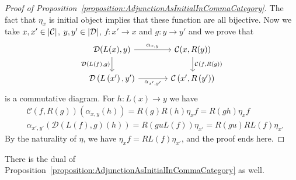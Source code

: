 \begin{proof}[Proof of
  Proposition~\ref{proposition:AdjunctionAsInitialInCommaCategory}]
  The fact that \(\eta_x\) is initial object implies that these function
  are all bijective. Now we take \(x, x' \in \left\lvert\mathcal{C}\right\rvert\),
  \(y, y' \in \left\lvert\mathcal{D}\right\rvert\), \(f : x' \to x\) and \(g : y \to y'\) and we
  prove that
  \[
    \begin{tikzcd}[column sep=large]
      \mathcal{D}(L(x), y) \ar["{\mathcal{D}(L(f), g)}", d, swap] \ar["{\alpha_{x,y}}", r] & \mathcal{C}(x, R(y)) \ar["{\mathcal{C}(f, R(g))}", d] \\
      \mathcal{D}\left(L\left(x'\right), y'\right) \ar["{\alpha_{x',y'}}", r,
      swap] & \mathcal{C}\left(x', R\left(y'\right)\right)
    \end{tikzcd}
  \]
  is a commutative diagram. For \(h : L(x) \to y\) we have
  \begin{align*}
    & \mathcal{C}(f, R(g)) \left(\alpha_{x,y} (h)\right) = R(g) R(h) \eta_x f = R(gh) \eta_x f \\
    & \alpha_{x',y'} \left(\mathcal{D} (L(f), g)(h)\right) = R(guL(f)) \eta_{x'} = R(gu) RL(f) \eta_{x'}
  \end{align*}
  By the naturality of \(\eta\), we have \(\eta_x f = RL(f) \eta_{x'}\), and the
  proof ends here.
\end{proof}



There is the dual of
Proposition~\ref{proposition:AdjunctionAsInitialInCommaCategory} as
well.

